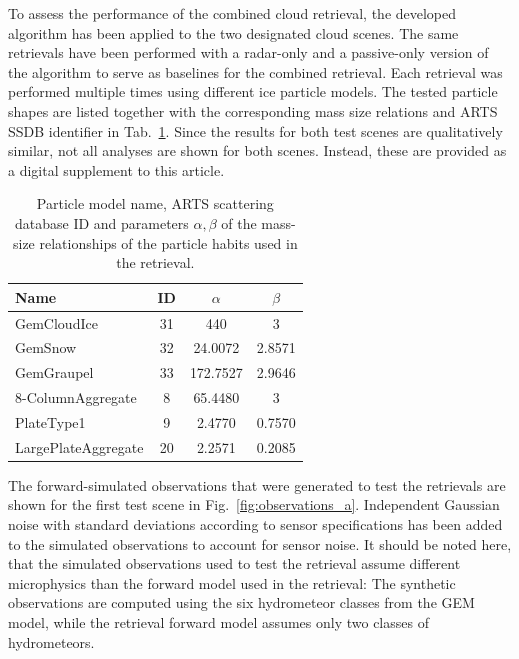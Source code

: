 \documentclass[journal abbreviation, manuscript]{copernicus}
\begin{document}
To assess the performance of the combined cloud retrieval, the developed
algorithm has been applied to the two designated cloud scenes. The same
retrievals have been performed with a radar-only and a passive-only version of
the algorithm to serve as baselines for the combined retrieval. Each retrieval
was performed multiple times using different ice particle models. The tested
particle shapes are listed together with the corresponding mass size relations
and ARTS SSDB identifier in Tab.~\ref{tab:particles_retrieval}. Since the
results for both test scenes are qualitatively similar, not all analyses are
shown for both scenes. Instead, these are provided as a digital supplement to
this article.

\begin{table}
  \centering
  \caption{Particle model name, ARTS scattering database ID and parameters
    $\alpha, \beta$ of the mass-size relationships of the particle habits used
    in the retrieval.}
  \begin{tabular}{l|c|c|c}
    Name & ID & $\alpha$ & $\beta$ \\
    \hline
    GemCloudIce         & 31  & 440      & 3 \\
    GemSnow             & 32  & 24.0072  & 2.8571 \\
    GemGraupel          & 33  & 172.7527 & 2.9646 \\
    8-ColumnAggregate   &  8  & 65.4480  & 3      \\
    PlateType1          &  9  & 2.4770   & 0.7570 \\
    LargePlateAggregate &  20 & 2.2571   & 0.2085 \\
  \end{tabular}
  \label{tab:particles_retrieval}
\end{table}

The forward-simulated observations that were generated to test the retrievals
are shown for the first test scene in Fig.~\ref{fig:observations_a}. Independent
Gaussian noise with standard deviations according to sensor specifications has
been added to the simulated observations to account for sensor noise. It should
be noted here, that the simulated observations used to test the retrieval
assume different microphysics than the forward model used in the retrieval: The
synthetic observations are computed using the six hydrometeor classes from the
GEM model, while the retrieval forward model assumes only two classes of
hydrometeors.
\end{document}
